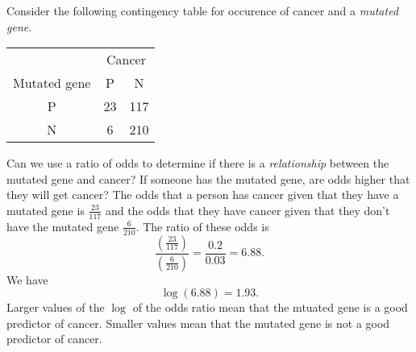 \begin{example}
    Consider the following contingency table for occurence of cancer
    and a \emph{mutated gene}.
    \begin{center}
        \begin{tabular}{ccc}
            \toprule
              & \multicolumn{2}{c}{Cancer} \\
            Mutated gene  & P  & N \\
            \midrule
            P & 23 & 117 \\
            N & 6  & 210 \\
            \bottomrule
        \end{tabular}
    \end{center}
    Can we use a ratio of odds to determine if there is a \emph{relationship} between
    the mutated gene and cancer?
    If someone has the mutated gene,
    are odds higher that they will get cancer?
    The odds that a person has cancer given that they have a mutated gene
    is $\frac{23}{117}$
    and the odds that they have cancer given that they don't have the mutated gene
    $\frac{6}{210}$.
    The ratio of these odds is
    \[
        \frac{\left(\frac{23}{117}\right)}{\left(\frac{6}{210}\right)}
        = \frac{0.2}{0.03}
        = 6.88.
    \]
    We have
    \[
        \log(6.88) = 1.93.
    \]
    Larger values of the $\log$ of the odds ratio 
    mean that the mtuated gene is a good
    predictor of cancer.
    Smaller values mean that the mutated gene is not a good predictor of cancer.
\end{example}

